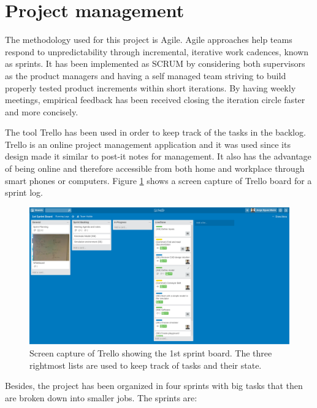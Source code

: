 \section{Project management} %
\label{sec:project_management}
The methodology used for this project is Agile.
Agile approaches help teams respond to unpredictability through incremental, iterative work cadences, known as sprints.
It has been implemented as SCRUM \cite{singh2008u} by considering both supervisors as the product managers and having a self managed team striving to build properly tested product increments within short iterations.
By having weekly meetings, empirical feedback has been received closing the iteration circle faster and more concisely.

The tool Trello \cite{trello} has been used in order to keep track of the tasks in the backlog.
Trello is an online project management application and it was used since its design made it similar to post-it notes for management.
It also has the advantage of being online and therefore accessible from both home and workplace through smart phones or computers.
Figure \ref{fig:trello} shows a screen capture of Trello board for a sprint log.

\begin{figure}[ht]
  \centering
  \includegraphics[width=\textwidth]{figures/trello.png}
  \caption{Screen capture of Trello showing the 1st sprint board. The three
rightmost lists are used to keep track of tasks and their state.}
  \label{fig:trello}
\end{figure}

Besides, the project has been organized in four sprints with big tasks that then are broken down into smaller jobs. The sprints are:
